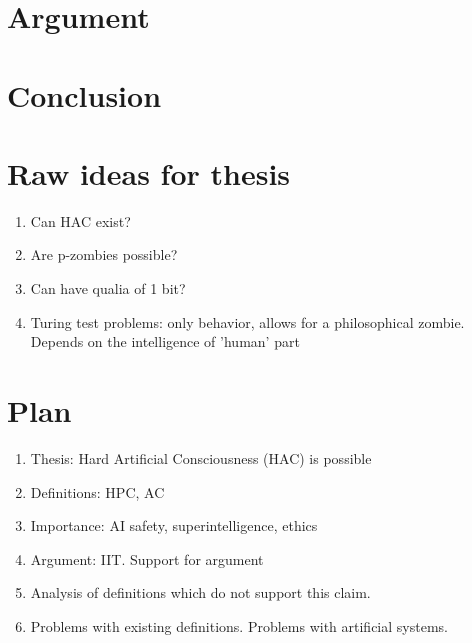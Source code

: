 \documentclass[a4paper, 12pt]{article}
\begin{document}




\section{Argument}
\section{Conclusion}
\section{Raw ideas for thesis}
\begin{enumerate}
	\item Can HAC exist?
	\item Are p-zombies possible?
	\item Can have qualia of 1 bit?
	\item Turing test problems: only behavior, allows for a philosophical zombie. Depends on the intelligence of 'human' part
\end{enumerate}
\section{Plan}
\begin{enumerate}
	\item Thesis: Hard Artificial Consciousness (HAC) is possible
	\item Definitions: HPC, AC
	\item Importance: AI safety, superintelligence, ethics
	\item Argument: IIT. Support for argument
	\item Analysis of definitions which do not support this claim.
	\item Problems with existing definitions. Problems with artificial systems.
\end{enumerate}
\end{document}
